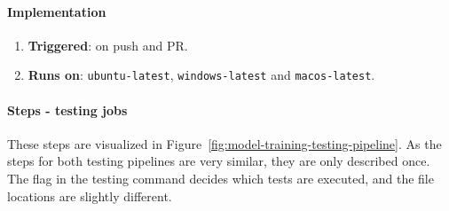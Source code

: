 \paragraph{Implementation}
\begin{enumerate}
    \item \textbf{Triggered}: on push and PR. 
    \item \textbf{Runs on}: \verb|ubuntu-latest|, \verb|windows-latest| and \verb|macos-latest|.
\end{enumerate}
\paragraph{Steps - testing jobs} These steps are visualized in Figure~\ref{fig:model-training-testing-pipeline}. As the steps for both testing pipelines are very similar, they are only described once. The flag in the testing command decides which tests are executed, and the file locations are slightly different. 
